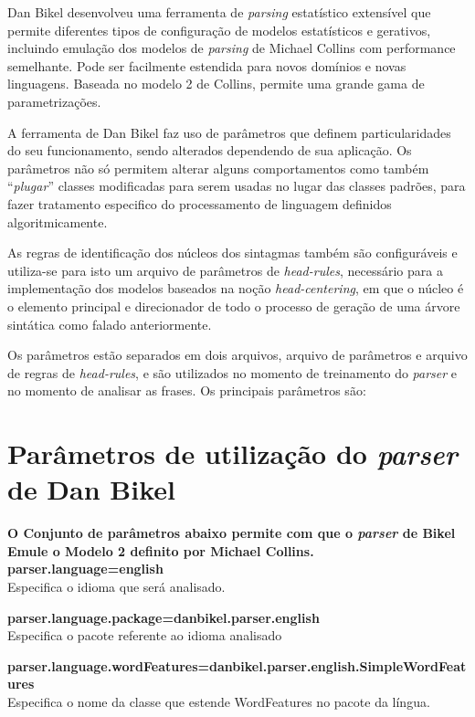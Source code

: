 Dan Bikel desenvolveu uma ferramenta de \emph{parsing} estatístico extensível que permite diferentes tipos de configuração de modelos estatísticos e gerativos, incluindo emulação dos modelos de \emph{parsing} de Michael Collins com performance semelhante. Pode ser facilmente estendida para novos domínios e novas linguagens. Baseada no modelo 2 de Collins, permite uma grande gama de parametrizações.

A ferramenta de Dan Bikel faz uso de parâmetros que definem particularidades do seu funcionamento, sendo alterados dependendo de sua aplicação. Os parâmetros não só permitem alterar alguns comportamentos como também ``\emph{plugar}'' classes modificadas para serem usadas no lugar das classes padrões, para fazer tratamento especifico do processamento de linguagem definidos algoritmicamente.

As regras de identificação dos núcleos dos sintagmas também são configuráveis e utiliza-se para isto um arquivo de parâmetros de \emph{head-rules}, necessário para a implementação dos modelos baseados na noção \emph{head-centering}, em que o núcleo é o elemento principal e direcionador de todo o processo de geração de uma árvore sintática como falado anteriormente.

Os parâmetros estão separados em dois arquivos, arquivo de parâmetros e arquivo de regras de \emph{head-rules}, e são utilizados no momento de treinamento do \emph{parser} e no momento de analisar as frases. Os principais parâmetros são:

\section{Parâmetros de utilização do \emph{parser} de Dan Bikel}
\label{sec:bikelest_param}

\scriptsize

\textbf{O Conjunto de parâmetros abaixo permite com que o \emph{parser} de Bikel Emule o Modelo 2 definito por Michael Collins.}\\

\textbf{parser.language=english}\\
Especifica o idioma que será analisado.

\textbf{parser.language.package=danbikel.parser.english}\\
Especifica o pacote referente ao idioma analisado

\textbf{parser.language.wordFeatures=danbikel.parser.english.SimpleWordFeatures}\\
Especifica o nome da classe que estende WordFeatures no pacote da língua.

